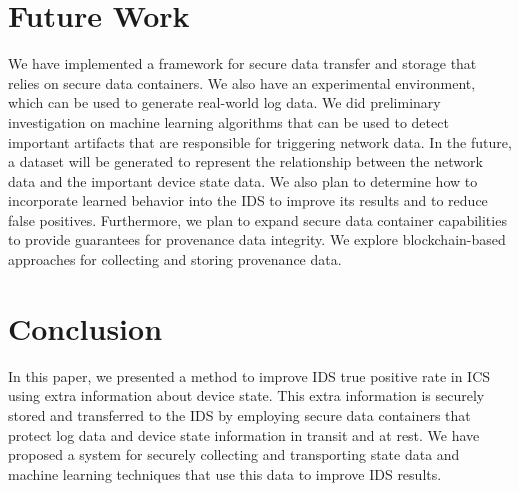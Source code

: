 \documentclass[conference]{IEEEtran}
\begin{document}
\section{Future Work}
We have implemented a framework for secure data transfer and storage that relies on secure data containers. We also have an experimental environment, which can be used to generate real-world log data. We did preliminary investigation on machine learning algorithms that can be used to detect important artifacts that are responsible for triggering network data. In the future, a dataset will be generated to represent the relationship between the network data and the important device state data. We also plan to determine how to incorporate learned behavior into the IDS to improve its results and to reduce false positives. Furthermore, we plan to expand secure data container capabilities to provide guarantees for provenance data integrity. We explore blockchain-based approaches for collecting and storing provenance data.   

\section{Conclusion}
In this paper, we presented a method to improve IDS true positive rate in ICS using extra information about device state. This extra information is securely stored and transferred to the IDS by employing secure data containers that protect log data and device state information in transit and at rest. We have proposed a system for securely collecting and transporting state data and machine learning techniques that use this data to improve IDS results. 
\end{document}
